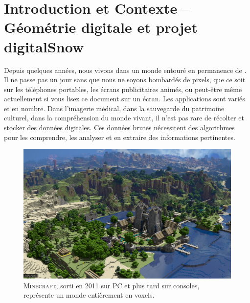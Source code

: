 %
\chapter{Introduction et Contexte -- Géométrie digitale et projet digitalSnow}
\label{sec:introduction}


\setcounter{minitocdepth}{3}
\minitoc

\newpage

Depuis quelques années, nous vivons dans un monde entouré en permanence de
. Il ne passe pas un jour sans que nous ne soyons
bombardés de pixels, que ce soit sur les téléphones portables, les écrans
publicitaires animés, ou peut-être même actuellement si vous lisez ce document
sur un écran. Les applications sont variés et en nombre. Dans l'imagerie
médical, dans la sauvegarde du patrimoine culturel, dans la compréhension du
monde vivant, il n'est pas rare de récolter et stocker des données digitales.
Ces données brutes nécessitent des algorithmes pour les comprendre, les analyser
et en extraire des informations pertinentes.

\begin{figure}[t]
    \begin{center}
      \includegraphics[width=14cm]{images/Introduction/minecraft-beautiful}
    \end{center}
    \caption{\textsc{Minecraft}, sorti en 2011 sur PC et plus tard sur consoles, représente un monde entièrement en voxels.}
    \label{fig:minecraft}
\end{figure}

